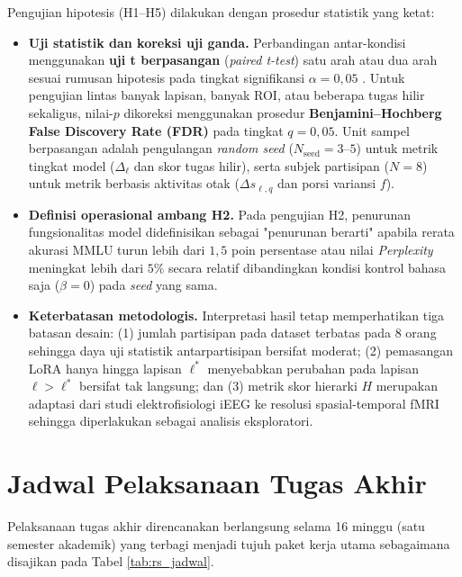 Pengujian hipotesis (H1--H5) dilakukan dengan prosedur statistik yang ketat:
\begin{itemize}
  \item \textbf{Uji statistik dan koreksi uji ganda.} Perbandingan antar-kondisi menggunakan \textbf{uji t berpasangan} (\textit{paired t-test}) satu arah atau dua arah sesuai rumusan hipotesis pada tingkat signifikansi $\alpha = 0{,}05$ \autocite{xiao2026beyond}. Untuk pengujian lintas banyak lapisan, banyak ROI, atau beberapa tugas hilir sekaligus, nilai-$p$ dikoreksi menggunakan prosedur \textbf{Benjamini--Hochberg False Discovery Rate (FDR)} pada tingkat $q = 0{,}05$. Unit sampel berpasangan adalah pengulangan \textit{random seed} ($N_{\text{seed}} = 3\text{--}5$) untuk metrik tingkat model ($\Delta_\ell$ dan skor tugas hilir), serta subjek partisipan ($N = 8$) untuk metrik berbasis aktivitas otak ($\Delta s_{\ell,q}$ dan porsi variansi $f$).
  \item \textbf{Definisi operasional ambang H2.} Pada pengujian H2, penurunan fungsionalitas model didefinisikan sebagai "penurunan berarti" apabila rerata akurasi MMLU turun lebih dari $1{,}5$ poin persentase atau nilai \textit{Perplexity} meningkat lebih dari $5\%$ secara relatif dibandingkan kondisi kontrol bahasa saja ($\beta = 0$) pada \textit{seed} yang sama.
  \item \textbf{Keterbatasan metodologis.} Interpretasi hasil tetap memperhatikan tiga batasan desain: (1) jumlah partisipan pada dataset \textcite{lebel2023natural} terbatas pada 8 orang sehingga daya uji statistik antarpartisipan bersifat moderat; (2) pemasangan LoRA hanya hingga lapisan $\ell^*$ menyebabkan perubahan pada lapisan $\ell > \ell^*$ bersifat tak langsung; dan (3) metrik skor hierarki $H$ merupakan adaptasi dari studi elektrofisiologi iEEG \autocite{mischler2024contextual} ke resolusi spasial-temporal fMRI sehingga diperlakukan sebagai analisis eksploratori.
\end{itemize}

\section{Jadwal Pelaksanaan Tugas Akhir}
\label{sec:rs_jadwal}

Pelaksanaan tugas akhir direncanakan berlangsung selama 16 minggu (satu semester akademik) yang terbagi menjadi tujuh paket kerja utama sebagaimana disajikan pada Tabel \ref{tab:rs_jadwal}.

